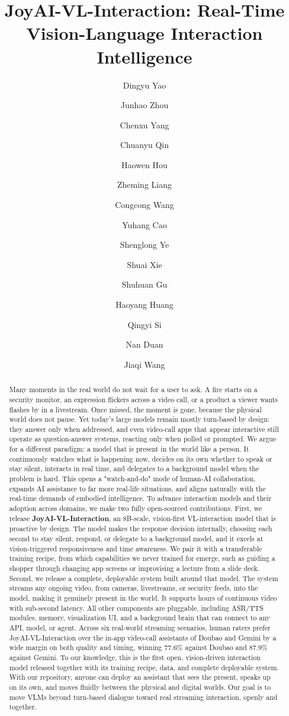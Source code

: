 \documentclass{llmxive}
\title{JoyAI-VL-Interaction: Real-Time Vision-Language Interaction Intelligence}
\author{Dingyu Yao \and Junhao Zhou \and Chenxu Yang \and Chuanyu Qin \and Haowen Hou \and Zheming Liang \and Congcong Wang \and Yuhang Cao \and Shenglong Ye \and Shuai Xie \and Shuhuan Gu \and Haoyang Huang \and Qingyi Si \and Nan Duan \and Jiaqi Wang}
\begin{document}
\maketitle
\begin{abstract}
Many moments in the real world do not wait for a user to ask. A fire starts on a security monitor, an expression flickers across a video call, or a product a viewer wants flashes by in a livestream. Once missed, the moment is gone, because the physical world does not pause. Yet today’s large models remain mostly turn-based by design: they answer only when addressed, and even video-call apps that appear interactive still operate as question-answer systems, reacting only when polled or prompted. We argue for a different paradigm: a model that is present in the world like a person. It continuously watches what is happening now, decides on its own whether to speak or stay silent, interacts in real time, and delegates to a background model when the problem is hard. This opens a "watch-and-do" mode of human-AI collaboration, expands AI assistance to far more real-life situations, and aligns naturally with the real-time demands of embodied intelligence. To advance interaction models and their adoption across domains, we make two fully open-sourced contributions. First, we release \textbf{JoyAI-VL-Interaction}, an 8B-scale, vision-first VL-interaction model that is proactive by design. The model makes the response decision internally, choosing each second to stay silent, respond, or delegate to a background model, and it excels at vision-triggered responsiveness and time awareness. We pair it with a transferable training recipe, from which capabilities we never trained for emerge, such as guiding a shopper through changing app screens or improvising a lecture from a slide deck. Second, we release a complete, deployable system built around that model. The system streams any ongoing video, from cameras, livestreams, or security feeds, into the model, making it genuinely present in the world. It supports hours of continuous video with sub-second latency. All other components are pluggable, including ASR/TTS modules, memory, visualization UI, and a background brain that can connect to any API, model, or agent.
Across six real-world streaming scenarios, human raters prefer JoyAI-VL-Interaction over the in-app video-call assistants of Doubao and Gemini by a wide margin on both quality and timing, winning 77.6\% against Doubao and 87.9\% against Gemini. To our knowledge, this is the first open, vision-driven interaction model released together with its training recipe, data, and complete deployable system.
With our repository, anyone can deploy an assistant that sees the present, speaks up on its own, and moves fluidly between the physical and digital worlds. 
Our goal is to move VLMs beyond turn-based dialogue toward real streaming interaction, openly and together.
\end{abstract}
\end{document}
